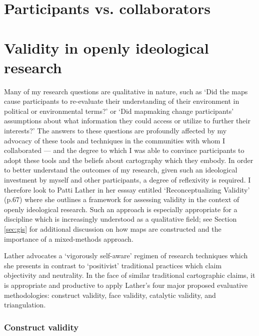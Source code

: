 \documentclass[11pt]{report}
\begin{document}
\section{Participants vs. collaborators}


\section{Validity in openly ideological research}
\label{sec:lather}

Many of my research questions are qualitative in nature, such as `Did the maps cause participants to re-evaluate their understanding of their environment in political or environmental terms?' or `Did mapmaking change participants' assumptions about what information they could access or utilize to further their interests?' The answers to these questions are profoundly affected by my advocacy of these tools and techniques in the communities with whom I collaborated --- and the degree to which I was able to convince participants to adopt these tools and the beliefs about cartography which they embody. In order to better understand the outcomes of my research, given such an ideological investment by myself and other participants, a degree of reflexivity is required. I therefore look to Patti Lather in her esssay entitled `Reconceptualizing Validity' (p.67) where she outlines a framework for assessing validity in the context of openly ideological research. Such an approach is especially appropriate for a discipline which is increasingly understood as a qualitative field; see Section \ref{sec:gis} for additional discussion on how maps are constructed and the importance of a mixed-methods approach. 

Lather advocates a `vigorously self-aware' regimen of research techniques which she presents in contrast to `positivist' traditional practices which claim objectivity and neutrality. In the face of similar traditional cartographic claims, it is appropriate and productive to apply Lather's four major proposed evaluative methodologies: construct validity, face validity, catalytic validity, and triangulation. 

\subsubsection{Construct validity}
\end{document}
